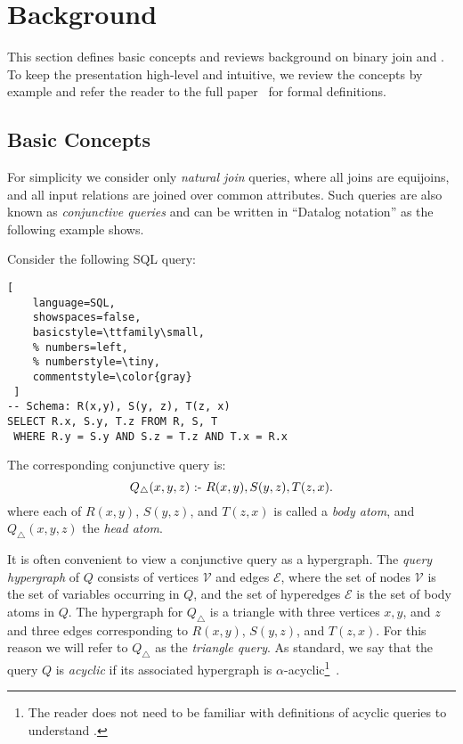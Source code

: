 \section{Background}\label{sec:background}

This section defines basic concepts and reviews background on binary
join and \GJ.
To keep the presentation high-level and intuitive,
we review the concepts by example
and refer the reader to the full paper~\cite{10.1145/3589295}
for formal definitions.

\subsection{Basic Concepts}\label{sec:basic-concepts}

For simplicity we consider only {\em natural join} queries,
where all joins are equijoins, and all input relations
are joined over common attributes.
Such queries are also known as {\em conjunctive queries}
and can be written in ``Datalog notation'' as the following
example shows.

\begin{example} \label{ex:triangle} Consider the following SQL query:
  \begin{lstlisting}[
    language=SQL,
    showspaces=false,
    basicstyle=\ttfamily\small,
    % numbers=left,
    % numberstyle=\tiny,
    commentstyle=\color{gray}
 ]
-- Schema: R(x,y), S(y, z), T(z, x)
SELECT R.x, S.y, T.z FROM R, S, T 
 WHERE R.y = S.y AND S.z = T.z AND T.x = R.x
\end{lstlisting}
  The corresponding conjunctive query is:
  $$Q_{\triangle}(x,y,z) \text{ :- } R(x, y), S(y,z), T(z, x).$$
  where each of $R(x, y)$, $S(y,z)$, and $T(z, x)$
  is called a {\em body atom}, and $Q_\triangle(x, y, z)$
  the {\em head atom}.
\end{example}

It is often convenient to view a conjunctive query as
a hypergraph.  The \emph{query hypergraph} of $Q$ consists of vertices
$\mathcal{V}$ and edges $\mathcal{E}$, where the set of nodes
$\mathcal{V}$ is the set of variables occurring in $Q$, and the set of
hyperedges $\mathcal{E}$ is the set of body atoms in $Q$.
The hypergraph for $Q_\triangle$ is a triangle with three
vertices $x, y$, and $z$ and three edges corresponding to
$R(x, y)$, $S(y,z)$, and $T(z, x)$.
For this reason we will refer to $Q_\triangle$ as the {\em triangle
    query}.
As standard, we
say that the query $Q$ is {\em acyclic} if its associated hypergraph
is $\alpha$-acyclic\footnote{The reader does not need to be familiar
  with definitions of acyclic queries to understand \FJ.}~\cite{DBLP:journals/jacm/Fagin83}.


